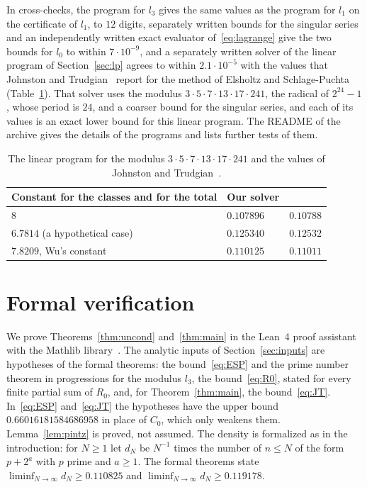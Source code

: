 \documentclass[11pt]{amsart}
\theoremstyle{definition}
\theoremstyle{remark}
\numberwithin{equation}{section}
\newcommand{\DmainG}{0.119178}%
\newcommand{\DcertG}{0.1191789096}
\newcommand{\DuncondG}{0.110825}%
\newcommand{\DuncondGcert}{0.1108257388}
\newcommand{\Lich}{6.7814}
\newcommand{\Duncond}{\DuncondG}\newcommand{\Duncondcert}{\DuncondGcert}
\newcommand{\Dmain}{\DmainG}\newcommand{\Dcert}{\DcertG}
\begin{document}
In cross-checks, the program for $l_3$ gives the same values as the program for $l_1$ on the certificate of $l_1$, to $12$ digits, separately written bounds for the singular series and an independently written exact evaluator of~\eqref{eq:lagrange} give the two bounds for $l_0$ to within $7\cdot10^{-9}$, and a separately written solver of the linear program of Section~\ref{sec:lp} agrees to within $2.1\cdot10^{-5}$ with the values that Johnston and Trudgian~\cite{JT26} report for the method of Elsholtz and Schlage-Puchta (Table~\ref{tab:jt}). That solver uses the modulus $3\cdot5\cdot7\cdot13\cdot17\cdot241$, the radical of $2^{24}-1$, whose period is $24$, and a coarser bound for the singular series, and each of its values is an exact lower bound for this linear program. The README of the archive gives the details of the programs and lists further tests of them.

\begin{table}[ht]
\centering
\small
\caption{The linear program for the modulus $3\cdot5\cdot7\cdot13\cdot17\cdot241$ and the values of Johnston and Trudgian~\cite{JT26}.}\label{tab:jt}
\begin{tabular}{@{}lll@{}}
\toprule
Constant for the classes and for the total & Our solver & \cite{JT26}\\
\midrule
$8$ & $0.107896$ & $0.10788$\\
$\Lich$ (a hypothetical case) & $0.125340$ & $0.12532$\\
$7.8209$, Wu's constant & $0.110125$ & $0.11011$\\
\bottomrule
\end{tabular}
\end{table}


\section{Formal verification}\label{sec:lean}

We prove Theorems~\ref{thm:uncond} and~\ref{thm:main} in the Lean~4 proof assistant~\cite{Lean4} with the Mathlib library~\cite{Mathlib}. The analytic inputs of Section~\ref{sec:inputs} are hypotheses of the formal theorems: the bound~\eqref{eq:ESP} and the prime number theorem in progressions for the modulus $l_3$, the bound~\eqref{eq:R0}, stated for every finite partial sum of $R_0$, and, for Theorem~\ref{thm:main}, the bound~\eqref{eq:JT}. In~\eqref{eq:ESP} and~\eqref{eq:JT} the hypotheses have the upper bound $0.66016181584686958$ in place of $C_0$, which only weakens them. Lemma~\ref{lem:pintz} is proved, not assumed. The density is formalized as in the introduction: for $N\ge1$ let $d_N$ be $N^{-1}$ times the number of $n\le N$ of the form $p+2^a$ with $p$ prime and $a\ge1$. The formal theorems state $\liminf_{N\to\infty}d_N\ge\Duncond$ and $\liminf_{N\to\infty}d_N\ge\Dmain$.
\end{document}
